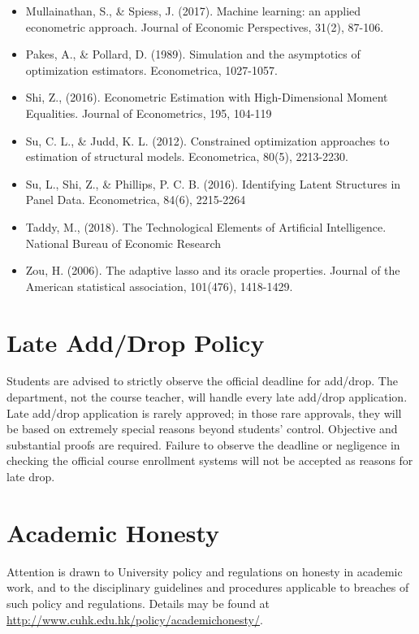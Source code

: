 \documentclass[11pt]{article}
\begin{document}
\begin{itemize}
\item Mullainathan, S., \& Spiess, J. (2017). Machine learning: an applied econometric approach. Journal of Economic Perspectives, 31(2), 87-106.
\item Pakes, A., \& Pollard, D. (1989). Simulation and the asymptotics of optimization estimators. Econometrica, 1027-1057. 
\item Shi, Z., (2016). Econometric Estimation with High-Dimensional Moment Equalities. Journal of Econometrics, 195, 104-119 
\item Su, C. L., \& Judd, K. L. (2012). Constrained optimization approaches to estimation of structural models. Econometrica, 80(5), 2213-2230.
\item Su, L., Shi, Z., \& Phillips, P. C. B. (2016). Identifying Latent Structures in Panel Data. Econometrica, 84(6), 2215-2264
\item Taddy, M., (2018). The Technological Elements of Artificial Intelligence. National Bureau of Economic Research 
\item Zou, H. (2006). The adaptive lasso and its oracle properties. Journal of the American statistical association, 101(476), 1418-1429.
\end{itemize}



\section*{Late Add/Drop Policy}

Students are advised to strictly observe the official deadline for add/drop. The department, not the course teacher, will handle every late add/drop application. Late add/drop application is rarely approved; in those rare approvals, they will be based on extremely special reasons beyond students' control. Objective and substantial proofs are required. Failure to observe the deadline or negligence in checking the official course enrollment systems will not be accepted as reasons for late drop.


\section*{Academic Honesty}
Attention is drawn to University policy and regulations on honesty in academic work, and to the disciplinary guidelines and procedures applicable to breaches of such policy and regulations. Details may be found at \url{http://www.cuhk.edu.hk/policy/academichonesty/}. 
\end{document}
